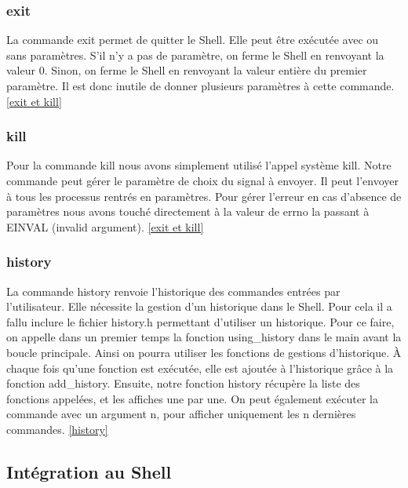 \documentclass[12pt]{article}
\begin{document}
 \subsubsection{exit}
 La commande exit permet de quitter le Shell. 
 Elle peut être exécutée avec ou sans paramètres. 
 S'il n'y a pas de paramètre, on ferme le Shell en renvoyant la valeur 0. 
 Sinon, on ferme le Shell en renvoyant la valeur entière du premier paramètre. Il est donc inutile de donner plusieurs paramètres à cette commande. \ref{exit et kill}
 
 \subsubsection{kill}
 Pour la commande kill nous avons simplement utilisé l'appel système kill. 
 Notre commande peut gérer le paramètre de choix du signal à envoyer. Il peut l'envoyer à tous les processus
 rentrés en paramètres.
 Pour gérer l'erreur en cas d'absence de paramètres nous avons touché directement à la valeur
 de errno la passant à EINVAL (invalid argument). \ref{exit et kill}
 
 \subsubsection{history}
 La commande history renvoie l'historique des commandes entrées par l'utilisateur. 
 Elle nécessite la gestion d'un historique dans le Shell. 
 Pour cela il a fallu inclure le fichier history.h permettant d'utiliser un historique. 
 Pour ce faire, on appelle dans un premier temps la fonction using\_history dans le main avant la boucle principale.
 Ainsi on pourra utiliser les fonctions de gestions d'historique. 
 À chaque fois qu'une fonction est exécutée, elle est ajoutée à l'historique grâce à la fonction add\_history. 
 Ensuite, notre fonction history récupère la liste des fonctions appelées, et les affiches une par une. 
 On peut également exécuter la commande avec un argument n, pour afficher uniquement les n dernières commandes. \ref{history}
 
 \subsection{Intégration au Shell}
 
\end{document}
